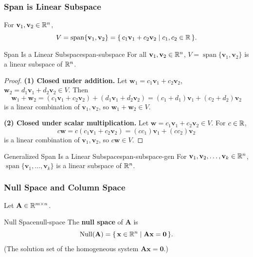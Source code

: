 \subsubsection{Span is Linear Subspace}

For $\mathbf{v}_1, \mathbf{v}_2 \in \mathbb{R}^n$,
\[
  V = \operatorname{span}\{\mathbf{v}_1, \mathbf{v}_2\} = \{\, c_1 \mathbf{v}_1 + c_2 \mathbf{v}_2 \mid c_1, c_2 \in \mathbb{R} \,\}.
\]

\begin{theorem}{Span Is a Linear Subspace}{span-subspace}
  For all $\mathbf{v}_1, \mathbf{v}_2 \in \mathbb{R}^n$, $V = \operatorname{span}\{\mathbf{v}_1, \mathbf{v}_2\}$ is a linear subspace of $\mathbb{R}^n$.
\end{theorem}

\begin{proof}
  \textbf{(1) Closed under addition.} Let $\mathbf{w}_1 = c_1 \mathbf{v}_1 + c_2 \mathbf{v}_2$, $\mathbf{w}_2 = d_1 \mathbf{v}_1 + d_2 \mathbf{v}_2 \in V$. Then
  \[
    \mathbf{w}_1 + \mathbf{w}_2
    = (c_1 \mathbf{v}_1 + c_2 \mathbf{v}_2) + (d_1 \mathbf{v}_1 + d_2 \mathbf{v}_2)
    = (c_1 + d_1) \mathbf{v}_1 + (c_2 + d_2) \mathbf{v}_2
  \]
  is a linear combination of $\mathbf{v}_1, \mathbf{v}_2$, so $\mathbf{w}_1 + \mathbf{w}_2 \in V$.

  \textbf{(2) Closed under scalar multiplication.} Let $\mathbf{w} = c_1 \mathbf{v}_1 + c_2 \mathbf{v}_2 \in V$. For $c \in \mathbb{R}$,
  \[
    c\mathbf{w} = c(c_1 \mathbf{v}_1 + c_2 \mathbf{v}_2) = (c c_1) \mathbf{v}_1 + (c c_2) \mathbf{v}_2
  \]
  is a linear combination of $\mathbf{v}_1, \mathbf{v}_2$, so $c\mathbf{w} \in V$.
\end{proof}

\begin{theorem}{Generalized Span Is a Linear Subspace}{span-subspace-gen}
  For $\mathbf{v}_1, \mathbf{v}_2, \ldots, \mathbf{v}_k \in \mathbb{R}^n$, $\operatorname{span}\{\mathbf{v}_1, \ldots, \mathbf{v}_k\}$ is a linear subspace of $\mathbb{R}^n$.
\end{theorem}

\subsubsection{Null Space and Column Space}

Let $\mathbf{A} \in \mathbb{R}^{m \times n}$.

\begin{definition}{Null Space}{null-space}
  The \textbf{null space} of $\mathbf{A}$ is
  \[
    \operatorname{Null}(\mathbf{A}) = \{\, \mathbf{x} \in \mathbb{R}^n \mid \mathbf{A}\mathbf{x} = \mathbf{0} \,\}.
  \]
  (The solution set of the homogeneous system $\mathbf{A}\mathbf{x} = \mathbf{0}$.)
\end{definition}

